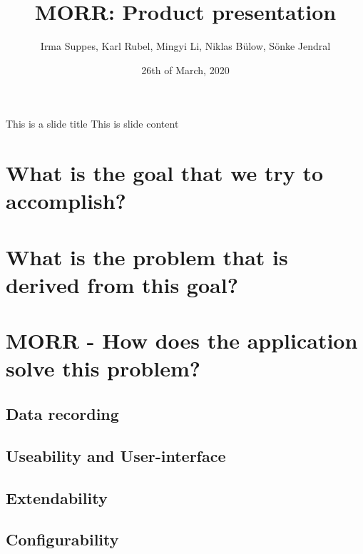 \documentclass[aspectratio=169]{beamer}
\title{MORR: Product presentation}
\author{Irma Suppes, Karl Rubel, Mingyi Li, Niklas Bülow, Sönke Jendral}
\date{26th of March, 2020}
\institute{KIT / Teco}
\begin{document}
  \maketitle

  \begin{frame}{This is a slide title}
    This is slide content
  \end{frame}

  \section{What is the goal that we try to accomplish?}

  \section{What is the problem that is derived from this goal?}

  \section{MORR - How does the application solve this problem?}

  \subsection{Data recording}

  \subsection{Useability and User-interface}

  \subsection{Extendability}

  \subsection{Configurability}
\end{document}
